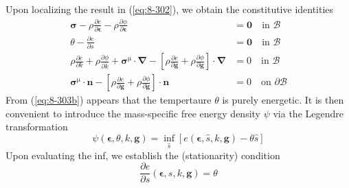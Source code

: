 Upon localizing the result in (\ref{eq:8-302}), we obtain the constitutive identities
\begin{subequations}\label{eq:8-303}
    \begin{align}
    \bm{\sigma} - \rho \frac{\partial e}{\partial \bm{\epsilon}} -  \rho \frac{\partial \phi}{\partial \dot{\bm{\epsilon}}} &= \bm{0} \quad
    \mbox{in } \mathcal{B}
\label{eq:8-303a}\\
    \theta - \frac{\partial e}{\partial s} &= \bm{0} \quad
    \mbox{in } \mathcal{B}
\label{eq:8-303b}\\
    \rho\frac{\partial e}{\partial k} + \rho\frac{\partial \phi}{\partial \dot{k}} +
    \bm{\sigma}^{\mathrm{\mu}}\cdot \bm{\nabla} - \left[\rho\frac{\partial e}{\partial \bm{g}} + \rho\frac{\partial \phi}{\partial \dot{\bm{g}}}\right] \cdot \bm{\nabla} &= 0 \quad
    \mbox{in }  \mathcal{B}
\label{eq:8-303c} \\
    \bm{\sigma}^{\mathrm{\mu}}\cdot \bm{n} - \left[\rho\frac{\partial e}{\partial \bm{g}} + \rho\frac{\partial \phi}{\partial \dot{\bm{g}}}\right] \cdot \bm{n} &= 0 \quad
    \mbox{on }  \partial\mathcal{B}
\label{eq:8-303d}
    \end{align}
\end{subequations}
From (\ref{eq:8-303b}) appears that the tempertaure $\theta$ is purely energetic. It is then convenient to introduce the mass-specific free energy density $\psi$ via the Legendre transformation
\begin{equation}
    \psi(\bm{\epsilon},\theta,k,\bm{g}) = \inf_{\hat{s}}
    \left[ e(\bm{\epsilon},\hat{s},k,\bm{g}) - \theta \hat{s} \right]
\label{eq:8-211}
\end{equation}
Upon evaluating the inf, we establish the (stationarity) condition
\begin{equation}
    \frac{\partial e}{\partial s}(\bm{\epsilon},s,k,\bm{g}) = \theta
\label{eq:8-212}
\end{equation}
